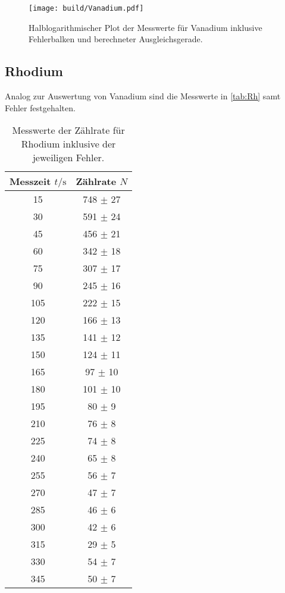 \begin{figure}[H]
    \centering
    \texttt{[image: build/Vanadium.pdf]}
    \caption{Halblogarithmischer Plot der Messwerte für Vanadium inklusive Fehlerbalken und berechneter Ausgleichsgerade.}
    \label{fig:Vn}
\end{figure}

\subsection{Rhodium}

Analog zur Auswertung von Vanadium sind die Messwerte in \autoref{tab:Rh} samt Fehler festgehalten.

\begin{table} [H]
    \centering
    \caption{Messwerte der Zählrate für Rhodium inklusive der jeweiligen Fehler.}
    \label{tab:Rh}
    \begin{tabular}{c c}
      \toprule
      Messzeit $t/\unit{\second}$ & Zählrate $N$\\
      \midrule
      15  & 748 $\pm$ 27 \\
      30  & 591 $\pm$ 24 \\
      45  & 456 $\pm$ 21 \\
      60  & 342 $\pm$ 18 \\
      75  & 307 $\pm$ 17 \\
      90  & 245 $\pm$ 16 \\
      105 & 222 $\pm$ 15 \\
      120 & 166 $\pm$ 13 \\
      135 & 141 $\pm$ 12 \\
      150 & 124 $\pm$ 11 \\
      165 &  97 $\pm$ 10 \\
      180 & 101 $\pm$ 10 \\
      195 &  80 $\pm$ 9 \\
      210 &  76 $\pm$ 8 \\
      225 &  74 $\pm$ 8 \\
      240 &  65 $\pm$ 8 \\
      255 &  56 $\pm$ 7 \\
      270 &  47 $\pm$ 7 \\
      285 &  46 $\pm$ 6 \\
      300 &  42 $\pm$ 6 \\
      315 &  29 $\pm$ 5 \\
      330 &  54 $\pm$ 7 \\
      345 &  50 $\pm$ 7 \\

\end{tabular}
\end{table}
